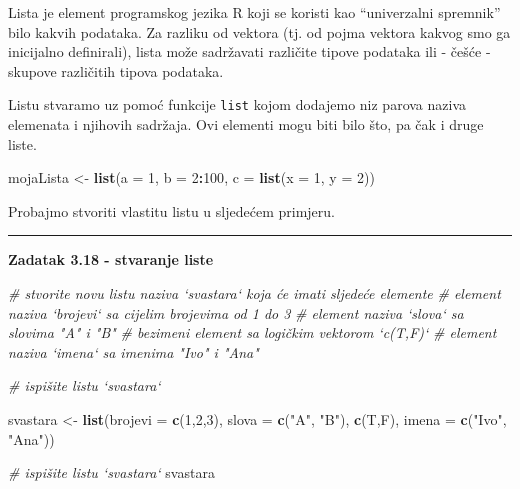 \documentclass[]{book}
\newenvironment{Shaded}{\begin{snugshade}}{\end{snugshade}}
\newcommand{\KeywordTok}[1]{\textcolor[rgb]{0.13,0.29,0.53}{\textbf{#1}}}
\newcommand{\DataTypeTok}[1]{\textcolor[rgb]{0.13,0.29,0.53}{#1}}
\newcommand{\DecValTok}[1]{\textcolor[rgb]{0.00,0.00,0.81}{#1}}
\newcommand{\StringTok}[1]{\textcolor[rgb]{0.31,0.60,0.02}{#1}}
\newcommand{\CommentTok}[1]{\textcolor[rgb]{0.56,0.35,0.01}{\textit{#1}}}
\newcommand{\OperatorTok}[1]{\textcolor[rgb]{0.81,0.36,0.00}{\textbf{#1}}}
\newcommand{\NormalTok}[1]{#1}
\theoremstyle{definition}
\theoremstyle{definition}
\theoremstyle{definition}
\theoremstyle{remark}
\begin{document}
Lista je element programskog jezika R koji se koristi kao ``univerzalni
spremnik'' bilo kakvih podataka. Za razliku od vektora (tj. od pojma
vektora kakvog smo ga inicijalno definirali), lista može sadržavati
različite tipove podataka ili - češće - skupove različitih tipova
podataka.

Listu stvaramo uz pomoć funkcije \texttt{list} kojom dodajemo niz parova
naziva elemenata i njihovih sadržaja. Ovi elementi mogu biti bilo što,
pa čak i druge liste.

\begin{Shaded}
\begin{Highlighting}[]
\NormalTok{mojaLista <-}\StringTok{ }\KeywordTok{list}\NormalTok{(}\DataTypeTok{a =} \DecValTok{1}\NormalTok{, }\DataTypeTok{b =} \DecValTok{2}\OperatorTok{:}\DecValTok{100}\NormalTok{, }\DataTypeTok{c =} \KeywordTok{list}\NormalTok{(}\DataTypeTok{x =} \DecValTok{1}\NormalTok{, }\DataTypeTok{y =} \DecValTok{2}\NormalTok{))}
\end{Highlighting}
\end{Shaded}

Probajmo stvoriti vlastitu listu u sljedećem primjeru.

\begin{center}\rule{0.5\linewidth}{\linethickness}\end{center}

\textbf{Zadatak 3.18 - stvaranje liste}

\begin{Shaded}
\begin{Highlighting}[]
\CommentTok{# stvorite novu listu naziva `svastara` koja će imati sljedeće elemente}
\CommentTok{#      element naziva `brojevi` sa cijelim brojevima od 1 do 3}
\CommentTok{#      element naziva `slova` sa slovima "A" i "B"}
\CommentTok{#      bezimeni element sa logičkim vektorom `c(T,F)`}
\CommentTok{#      element naziva `imena` sa imenima "Ivo" i "Ana"}


\CommentTok{# ispišite listu `svastara`}
\end{Highlighting}
\end{Shaded}

\begin{Shaded}
\begin{Highlighting}[]
\NormalTok{svastara <-}\StringTok{ }\KeywordTok{list}\NormalTok{(}\DataTypeTok{brojevi =} \KeywordTok{c}\NormalTok{(}\DecValTok{1}\NormalTok{,}\DecValTok{2}\NormalTok{,}\DecValTok{3}\NormalTok{), }
                 \DataTypeTok{slova =} \KeywordTok{c}\NormalTok{(}\StringTok{"A"}\NormalTok{, }\StringTok{"B"}\NormalTok{), }
                 \KeywordTok{c}\NormalTok{(T,F), }
                 \DataTypeTok{imena =} \KeywordTok{c}\NormalTok{(}\StringTok{"Ivo"}\NormalTok{, }\StringTok{"Ana"}\NormalTok{))}


\CommentTok{# ispišite listu `svastara`}
\NormalTok{svastara}
\end{Highlighting}
\end{Shaded}
\end{document}
